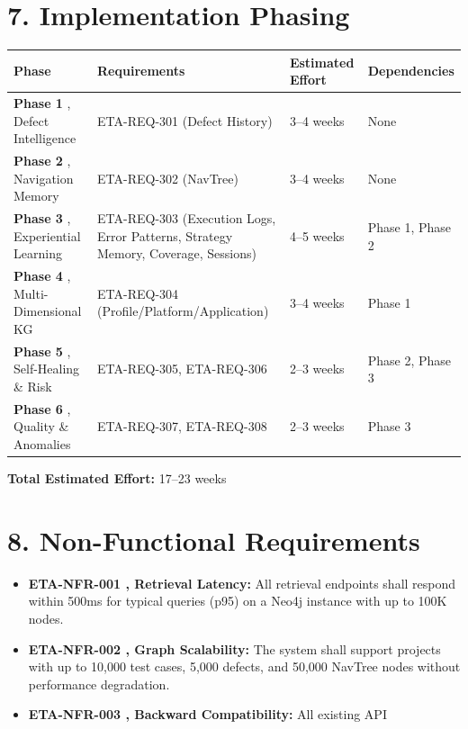 \section*{7. Implementation Phasing}

\begingroup\footnotesize\setlength{\tabcolsep}{4pt}
\begin{tabularx}{\textwidth}{@{}YYYY@{}}
\toprule
\textbf{Phase} & \textbf{Requirements} & \textbf{Estimated Effort} & \textbf{Dependencies} \\
\midrule
\textbf{Phase 1} ,  Defect Intelligence & ETA-REQ-301 (Defect History) & 3--4 weeks & None \\
\textbf{Phase 2} ,  Navigation Memory & ETA-REQ-302 (NavTree) & 3--4 weeks & None \\
\textbf{Phase 3} ,  Experiential Learning & ETA-REQ-303 (Execution Logs, Error Patterns, Strategy Memory, Coverage, Sessions) & 4--5 weeks & Phase 1, Phase 2 \\
\textbf{Phase 4} ,  Multi-Dimensional KG & ETA-REQ-304 (Profile/Platform/Application) & 3--4 weeks & Phase 1 \\
\textbf{Phase 5} ,  Self-Healing \& Risk & ETA-REQ-305, ETA-REQ-306 & 2--3 weeks & Phase 2, Phase 3 \\
\textbf{Phase 6} ,  Quality \& Anomalies & ETA-REQ-307, ETA-REQ-308 & 2--3 weeks & Phase 3 \\
\bottomrule\end{tabularx}\endgroup

\textbf{Total Estimated Effort:} 17--23 weeks

\section*{8. Non-Functional Requirements}

\begin{itemize}[leftmargin=1.4em,itemsep=1pt,topsep=3pt]
  \item \textbf{ETA-NFR-001 ,  Retrieval Latency:} All retrieval endpoints shall respond within 500ms for typical queries (p95) on a Neo4j instance with up to 100K nodes.
  \item \textbf{ETA-NFR-002 ,  Graph Scalability:} The system shall support projects with up to 10,000 test cases, 5,000 defects, and 50,000 NavTree nodes without performance degradation.
  \item \textbf{ETA-NFR-003 ,  Backward Compatibility:} All existing API
\end{itemize}

\endgroup
